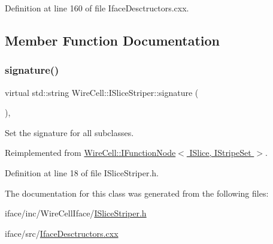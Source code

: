 Definition at line 160 of file Iface\+Desctructors.\+cxx.



\subsection{Member Function Documentation}
\mbox{\label{class_wire_cell_1_1_i_slice_striper_af1d85a4c0813c7e2d7826b3006dca9bc}} 
\subsubsection{\texorpdfstring{signature()}{signature()}}
{\footnotesize\ttfamily virtual std\+::string Wire\+Cell\+::\+I\+Slice\+Striper\+::signature (\begin{DoxyParamCaption}{ }\end{DoxyParamCaption})\hspace{0.3cm}{\ttfamily [inline]}, {\ttfamily [virtual]}}



Set the signature for all subclasses. 



Reimplemented from \hyperlink{class_wire_cell_1_1_i_function_node_af59f46cf19ca9fdf4aade1f289feedf2}{Wire\+Cell\+::\+I\+Function\+Node$<$ I\+Slice, I\+Stripe\+Set $>$}.



Definition at line 18 of file I\+Slice\+Striper.\+h.



The documentation for this class was generated from the following files\+:\begin{DoxyCompactItemize}
\item 
iface/inc/\+Wire\+Cell\+Iface/\hyperlink{_i_slice_striper_8h}{I\+Slice\+Striper.\+h}\item 
iface/src/\hyperlink{_iface_desctructors_8cxx}{Iface\+Desctructors.\+cxx}\end{DoxyCompactItemize}
